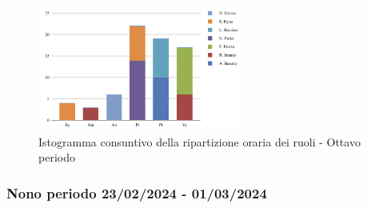 \begin{figure}[H]
    \centering
    \includegraphics[width=0.6\textwidth]{../Images/graficoCons8.png}
    \caption{Istogramma consuntivo della ripartizione oraria dei ruoli - Ottavo periodo}
    \label{fig:Consuntivo_ripartizione_oraria_8}
\end{figure}


\subsubsection{Nono periodo  23/02/2024 - 01/03/2024}

